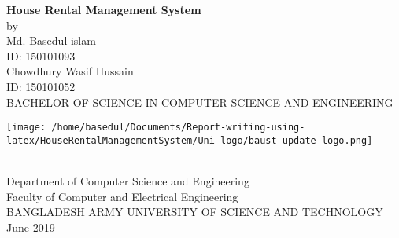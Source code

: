 \documentclass[12pt,a4paper]{report}
\begin{document}
\begin{titlepage}
	\center
	{\fontsize{16}{10}\selectfont \textbf{House Rental Management System}}\\
	\vspace{.5in}
	{\fontsize{12}{10}\selectfont by}\\
	\vspace{.5in}
	{\fontsize{12}{16}\selectfont 
	Md. Basedul islam\\ID: 150101093\\Chowdhury Wasif Hussain\\ID: 150101052}\\
	\vspace{1.2in}
	{\fontsize{12}{16}\selectfont 
	BACHELOR OF SCIENCE IN COMPUTER SCIENCE AND ENGINEERING}\\
	\vspace{1in}
	\begin{minipage}{0.25\textwidth}%
\texttt{[image: /home/basedul/Documents/Report-writing-using-latex/HouseRentalManagementSystem/Uni-logo/baust-update-logo.png]}
\end{minipage}\\
\vspace{1in}
	{\fontsize{12}{10}\selectfont Department of Computer Science and Engineering}\\
	\vspace{.5em}
	{\fontsize{12}{10}\selectfont Faculty of Computer and Electrical Engineering}\\
	\vspace{.5em}
	{\fontsize{12}{10}\selectfont BANGLADESH ARMY UNIVERSITY OF SCIENCE AND TECHNOLOGY}\\
	\vspace{.5em}
	{\fontsize{12}{10}\selectfont June 2019}
	
\end{titlepage}
\end{document}
